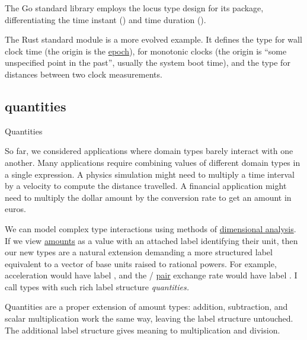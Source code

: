 \documentclass{article}
\begin{document}
The Go standard library employs the locus type design for its \href{https://pkg.go.dev/time}{} package, differentiating the time instant (\href{https://pkg.go.dev/time#Time}{}) and time duration (\href{https://pkg.go.dev/time#Duration}{}).

The Rust standard module \href{https://doc.rust-lang.org/std/time/index.html}{} is a more evolved example.
It defines the \href{https://doc.rust-lang.org/std/time/struct.SystemTime.html}{} type for wall clock time (the origin is the \href{https://doc.rust-lang.org/std/time/struct.SystemTime.html#associatedconstant.UNIX_EPOCH}{ epoch}), \href{https://doc.rust-lang.org/std/time/struct.Instant.html}{} for monotonic clocks (the origin is ``some unspecified point in the past'', usually the system boot time), and the \href{https://doc.rust-lang.org/std/time/struct.Duration.html}{} type for distances between two clock measurements.

\subsection{quantities}{Quantities}

So far, we considered applications where domain types barely interact with one another.
Many applications require combining values of different domain types in a single expression.
A physics simulation might need to multiply a time interval by a velocity to compute the distance travelled.
A financial application might need to multiply the dollar amount by the conversion rate to get an amount in euros.

We can model complex type interactions using methods of \href{https://en.wikipedia.org/wiki/Dimensional_analysis}{dimensional analysis}.
If we view \href{#amount-types}{amounts} as a value with an attached label identifying their unit, then our new types are a natural extension demanding a more structured label equivalent to a vector of base units raised to rational powers.
For example, acceleration would have label , and the / \href{https://en.wikipedia.org/wiki/Currency_pair}{pair} exchange rate would have label .
I call types with such rich label structure \em{quantities}.

Quantities are a proper extension of amount types: addition, subtraction, and scalar multiplication work the same way, leaving the label structure untouched.
The additional label structure gives meaning to multiplication and division.
\end{document}
